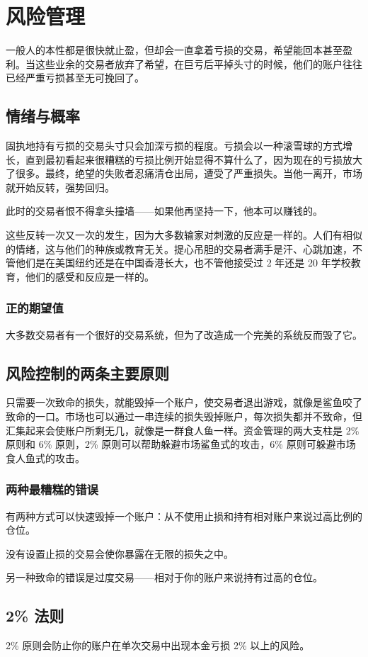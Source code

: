 \chapter{风险管理}
一般人的本性都是很快就止盈，但却会一直拿着亏损的交易，希望能回本甚至盈利。当这些业余的交易者放弃了希望，在巨亏后平掉头寸的时候，他们的账户往往已经严重亏损甚至无可挽回了。
\section{情绪与概率}
固执地持有亏损的交易头寸只会加深亏损的程度。亏损会以一种滚雪球的方式增长，直到最初看起来很糟糕的亏损比例开始显得不算什么了，因为现在的亏损放大了很多。最终，绝望的失败者忍痛清仓出局，遭受了严重损失。当他一离开，市场就开始反转，强势回归。

此时的交易者恨不得拿头撞墙——如果他再坚持一下，他本可以赚钱的。

这些反转一次又一次的发生，因为大多数输家对刺激的反应是一样的。人们有相似的情绪，这与他们的种族或教育无关。提心吊胆的交易者满手是汗、心跳加速，不管他们是在美国纽约还是在中国香港长大，也不管他接受过 2 年还是 20 年学校教育，他们的感受和反应是一样的。
\subsection*{正的期望值}
大多数交易者有一个很好的交易系统，但为了改造成一个完美的系统反而毁了它。
\section{风险控制的两条主要原则}
只需要一次致命的损失，就能毁掉一个账户，使交易者退出游戏，就像是鲨鱼咬了致命的一口。市场也可以通过一串连续的损失毁掉账户，每次损失都并不致命，但汇集起来会使账户所剩无几，就像是一群食人鱼一样。资金管理的两大支柱是 2\% 原则和 6\% 原则，2\% 原则可以帮助躲避市场鲨鱼式的攻击，6\% 原则可躲避市场食人鱼式的攻击。
\subsection*{两种最糟糕的错误}
有两种方式可以快速毁掉一个账户：从不使用止损和持有相对账户来说过高比例的仓位。

没有设置止损的交易会使你暴露在无限的损失之中。

另一种致命的错误是过度交易——相对于你的账户来说持有过高的仓位。
\section{2\% 法则}
\begin{tcolorbox}
    2\% 原则会防止你的账户在单次交易中出现本金亏损 2\% 以上的风险。
\end{tcolorbox}

